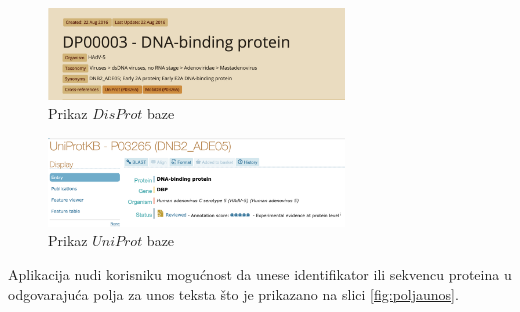 \begin{figure}[H]
	\centering
    \includegraphics[width=0.7\textwidth]{Figures/App/DisProt.png}
    \caption{Prikaz $DisProt$ baze}
    \label{fig:DisProt}
\end{figure}

\begin{figure}[H]
	\centering
    \includegraphics[width=0.7\textwidth]{Figures/App/UniProt.png}
    \caption{Prikaz $UniProt$ baze}
    \label{fig:UniProt}
\end{figure}

Aplikacija nudi korisniku mogućnost da unese identifikator ili sekvencu proteina u odgovarajuća polja za unos teksta što je prikazano na slici  \ref{fig:poljaunos}.

